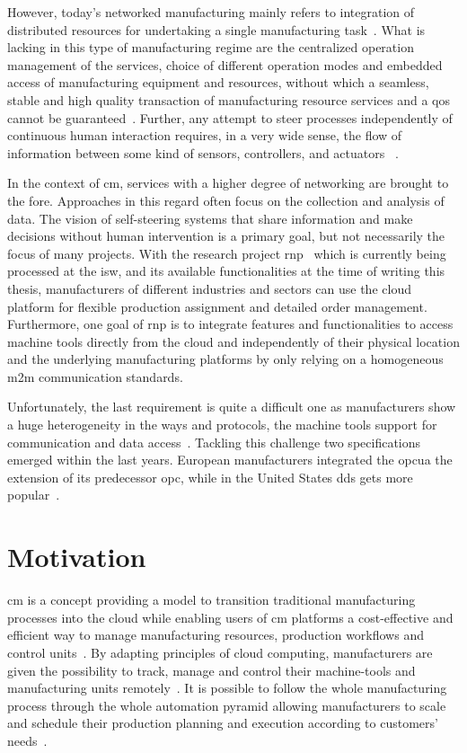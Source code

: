 \documentclass[
a4paper,
twoside,
headsepline,
cleardoublepage=empty,
parskip=half,
draft=false
]{scrbook}
\begin{document}
		However, today's networked manufacturing mainly refers to integration of distributed resources for undertaking a single manufacturing task~\cite{li2010cloud}.
		What is lacking in this type of manufacturing regime are the centralized operation management of the services, choice of different operation modes and embedded access of manufacturing equipment and resources, without which a seamless, stable and high quality transaction of manufacturing resource services and a \gls{qos} cannot be guaranteed~\cite{tao2010theory}.
		Further, any attempt to steer processes independently of continuous human interaction requires, in a very wide sense, the flow of information between some kind of sensors, controllers, and actuators ~\cite{sauter2011evolution}.

		In the context of \gls{cm}, services with a higher degree of networking are brought to the fore.
		Approaches in this regard often focus on the collection and analysis of data. The vision of self-steering systems that share information and make decisions without human intervention is a primary goal, but not necessarily the focus of many projects.
		With the research project \gls{rnp}~\cite{ellwein2016} which is currently being processed at the \gls{isw}, and its available functionalities at the time of writing this thesis, manufacturers of different industries and sectors can use the cloud platform for flexible production assignment and detailed order management.
		Furthermore, one goal of \gls{rnp} is to integrate features and functionalities to access machine tools directly from the cloud and independently of their physical location and the underlying manufacturing platforms by only relying on a homogeneous \gls{m2m} communication standards.

		Unfortunately, the last requirement is quite a difficult one as manufacturers show a huge heterogeneity in the ways and protocols, the machine tools support for communication and data access~\cite{xu2012cloud}.
		Tackling this challenge two specifications emerged within the last years.
		European manufacturers integrated the \gls{opcua} the extension of its predecessor \gls{opc}, while in the United States \gls{dds} gets more popular~\cite{niggemann2015data}.

		\section{Motivation}\label{sec:motivation}

			\gls{cm} is a concept providing a model to transition traditional manufacturing processes into the cloud while enabling users of \gls{cm} platforms a cost-effective and efficient way to manage manufacturing resources, production workflows and control units~\cite{xu2012cloud}.
			By adapting principles of cloud computing, manufacturers are given the possibility to track, manage and control their machine-tools and manufacturing units remotely~\cite{wu2013cloud}.
			It is possible to follow the whole manufacturing process through the whole automation pyramid allowing manufacturers to scale and schedule their production planning and execution according to customers' needs~\cite{kleinemeier2014automatisierungspyramide}.
\end{document}

